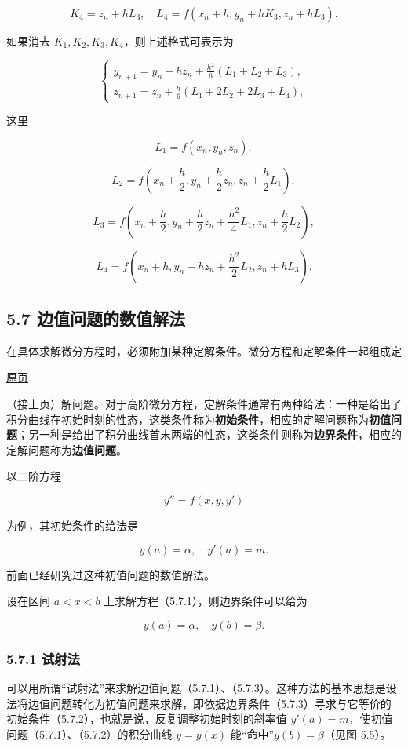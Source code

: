 \documentclass[
  10pt,
  fontset=fandol]{ctexart}
\begin{document}
\[
K_4=z_n+hL_3,\quad L_4=f(x_n+h,y_n+hK_3,z_n+hL_3).
\]

如果消去 \(K_1,K_2,K_3,K_4\)，则上述格式可表示为

\[
\begin{cases}
\displaystyle y_{n+1}=y_n+hz_n+\frac{h^2}{6}(L_1+L_2+L_3),\\[6pt]
\displaystyle z_{n+1}=z_n+\frac h6(L_1+2L_2+2L_3+L_4),
\end{cases}
\]

这里

\[
L_1=f(x_n,y_n,z_n),
\]

\[
L_2=f\left(x_n+\frac h2,y_n+\frac h2z_n,z_n+\frac h2L_1\right),
\]

\[
L_3=f\left(x_n+\frac h2,y_n+\frac h2z_n+\frac{h^2}{4}L_1,z_n+\frac h2L_2\right),
\]

\[
L_4=f\left(x_n+h,y_n+hz_n+\frac{h^2}{2}L_2,z_n+hL_3\right).
\]

\subsection{5.7 边值问题的数值解法}\label{ux8fb9ux503cux95eeux9898ux7684ux6570ux503cux89e3ux6cd5}

在具体求解微分方程时，必须附加某种定解条件。微分方程和定解条件一起组成定

\href{../../source-images/pdf-148.jpeg}{原页}

（接上页）解问题。对于高阶微分方程，定解条件通常有两种给法：一种是给出了积分曲线在初始时刻的性态，这类条件称为\textbf{初始条件}，相应的定解问题称为\textbf{初值问题}；另一种是给出了积分曲线首末两端的性态，这类条件则称为\textbf{边界条件}，相应的定解问题称为\textbf{边值问题}。

以二阶方程

\[
y''=f(x,y,y')
\tag{5.7.1}
\]

为例，其初始条件的给法是

\[
y(a)=\alpha,\quad y'(a)=m.
\tag{5.7.2}
\]

前面已经研究过这种初值问题的数值解法。

设在区间 \(a<x<b\) 上求解方程（5.7.1），则边界条件可以给为

\[
y(a)=\alpha,\quad y(b)=\beta.
\tag{5.7.3}
\]

\subsubsection{5.7.1 试射法}\label{ux8bd5ux5c04ux6cd5}

可以用所谓``试射法''来求解边值问题（5.7.1）、（5.7.3）。这种方法的基本思想是设法将边值问题转化为初值问题来求解，即依据边界条件（5.7.3）寻求与它等价的初始条件（5.7.2），也就是说，反复调整初始时刻的斜率值 \(y'(a)=m\)，使初值问题（5.7.1）、（5.7.2）的积分曲线 \(y=y(x)\) 能``命中''\(y(b)=\beta\)（见图 5.5）。
\end{document}
